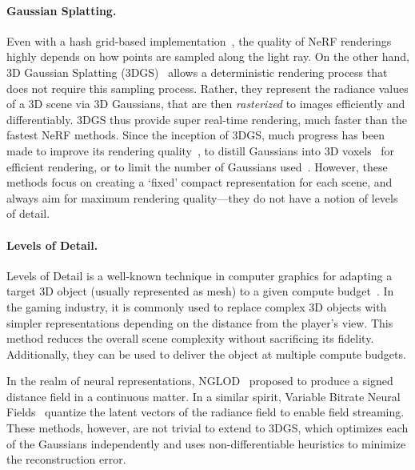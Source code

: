   \paragraph{Gaussian Splatting.}
    Even with a hash grid-based implementation~\cite{mueller2022instant}, the
    quality of NeRF renderings highly depends on how points are sampled along
    the light ray.
    On the other hand, 3D Gaussian Splatting (3DGS)~\cite{kerbl20233d} allows
    a deterministic rendering process that does not require this sampling
    process.
    Rather, they represent the radiance values of a 3D scene via 3D Gaussians,
    that are then \emph{rasterized} to images efficiently and differentiably.
    3DGS thus provide super real-time rendering, much faster than the fastest NeRF methods.
    Since the inception of 3DGS, much progress has been made to improve its
    rendering
    quality~\cite{taming3dgs2024mallick,bulo2024revising,huang20242d,jiang2024gaussianshader,liu2024citygaussian,girish2023eagles,kerbl2024hierarchical,radl2024stopthepop,yu2024mip},
    to distill Gaussians into 3D
    voxels~\cite{ren2024octree,lu2024scaffold,liu2024citygaussian} for
    efficient rendering, or to limit the number of Gaussians
    used~\cite{fan2023lightgaussian,niemeyer2024radsplat,lee2024compact,morgenstern2024compact,niedermayr2024compressed,fang2024mini}.
    However, these methods focus on creating a `fixed' compact representation
    for each scene, and always aim for maximum rendering quality---they do not
    have a notion of levels of detail.

  \paragraph{Levels of Detail.}
    Levels of Detail is a well-known technique in computer graphics for
    adapting a target 3D object (usually represented as mesh) to a given
    compute
    budget~\cite{clark1976hierarchical,niessner2012feature,luebke2002level}.
    In the gaming industry, it is commonly used to replace complex 3D objects
    with simpler representations depending on the distance from the player's
    view.
    This method reduces the overall scene complexity without sacrificing its
    fidelity.
    Additionally, they can be used to deliver the object at multiple compute
    budgets.

    In the realm of neural representations, NGLOD~\cite{takikawa2021neural}
    proposed to produce a signed distance field in a continuous matter.
    In a similar spirit, Variable Bitrate Neural
    Fields~\cite{takikawa2022variable} quantize the latent vectors of the
    radiance field to enable field streaming.
    These methods, however, are not trivial to extend to 3DGS, which optimizes
    each of the Gaussians independently and uses non-differentiable heuristics
    to minimize the reconstruction error.

